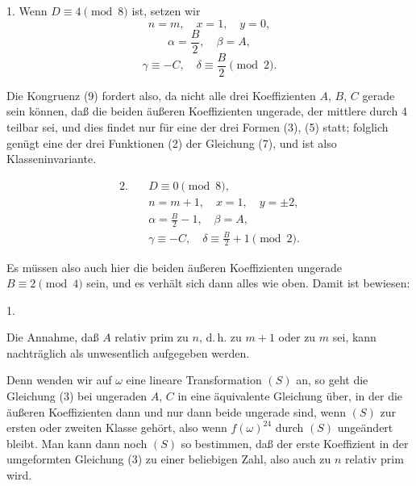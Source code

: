 

1. Wenn $D\equiv 4\pmod{8}$ ist, setzen wir
\[
n=m,\quad x=1,\quad y=0,
\]
\[
\alpha=\frac{B}{2},\quad \beta=A,
\]
\[
\gamma\equiv -C,\quad \delta\equiv\frac{B}{2}\pmod{2}.
\]

Die Kongruenz (9) fordert also, da nicht alle drei Koeffizienten $A$, $B$, $C$ gerade sein können, daß die beiden äußeren Koeffizienten ungerade, der mittlere durch 4 teilbar sei, und dies findet nur für eine der drei Formen (3), (5) statt; folglich genügt eine der drei Funktionen (2) der Gleichung (7), und ist also Klasseninvariante.

\[
\begin{aligned}
2.\quad &D\equiv 0\pmod{8},\\
&n=m+1,\quad x=1,\quad y=\pm 2,\\
&\alpha=\frac{B}{2}-1,\quad \beta=A,\\
&\gamma\equiv -C,\quad \delta\equiv\frac{B}{2}+1\pmod{2}.
\end{aligned}
\]

Es müssen also auch hier die beiden äußeren Koeffizienten ungerade $B\equiv 2\pmod{4}$ sein, und es verhält sich dann alles wie oben. Damit ist bewiesen:

1. 

Die Annahme, daß $A$ relativ prim zu $n$, d.\,h. zu $m+1$ oder zu $m$ sei, kann nachträglich als unwesentlich aufgegeben werden.

Denn wenden wir auf $\omega$ eine lineare Transformation $(S)$ an, so geht die Gleichung (3) bei ungeraden $A$, $C$ in eine äquivalente Gleichung über, in der die äußeren Koeffizienten dann und nur dann beide ungerade sind, wenn $(S)$ zur ersten oder zweiten Klasse gehört, also wenn $f(\omega)^{24}$ durch $(S)$ ungeändert bleibt. Man kann dann noch $(S)$ so bestimmen, daß der erste Koeffizient in der umgeformten Gleichung (3) zu einer beliebigen Zahl, also auch zu $n$ relativ prim wird.
